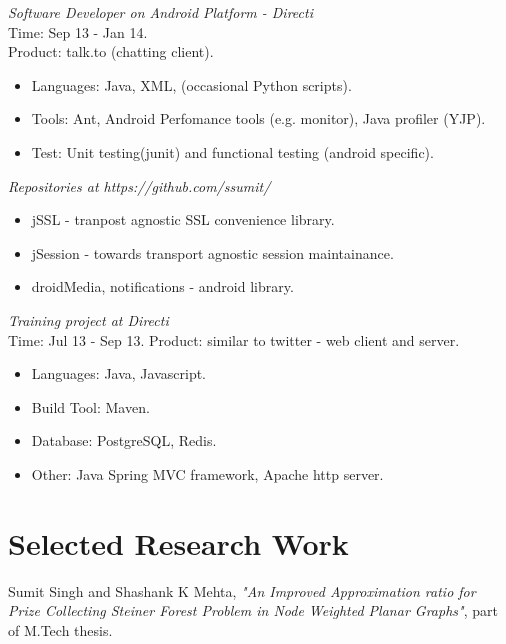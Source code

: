\documentclass[margin,line]{resume}
\begin{document}
\begin{resume}
\textit{Software Developer on Android Platform - Directi} \\
Time: Sep 13 - Jan 14.\\
Product: talk.to (chatting client).\\
\begin{itemize}
\item Languages: Java, XML, (occasional Python scripts).\\
\item Tools: Ant, Android Perfomance tools (e.g. monitor), Java profiler (YJP).\\
\item Test: Unit testing(junit) and functional testing (android specific).
 \end{itemize}

\textit{Repositories at https://github.com/ssumit/}\\
 \begin{itemize}
        \item jSSL - tranpost agnostic SSL convenience library.
        \item jSession - towards transport agnostic session maintainance.
        \item droidMedia, notifications - android library.
 \end{itemize}

\textit{Training project at Directi}\\
Time: Jul 13 - Sep 13.
Product: similar to twitter - web client and server.\\
 \begin{itemize}
\item Languages: Java, Javascript.
\item Build Tool: Maven.
\item Database: PostgreSQL, Redis.
\item Other: Java Spring MVC framework, Apache http server.  
 \end{itemize}




    \section{\mysidestyle Selected Research Work}
\vspace{-2mm}
Sumit Singh and Shashank K Mehta, \textit{ "An Improved Approximation ratio for Prize Collecting Steiner Forest Problem in Node Weighted Planar Graphs"}, part of M.Tech thesis.


\end{resume}
\end{document}
